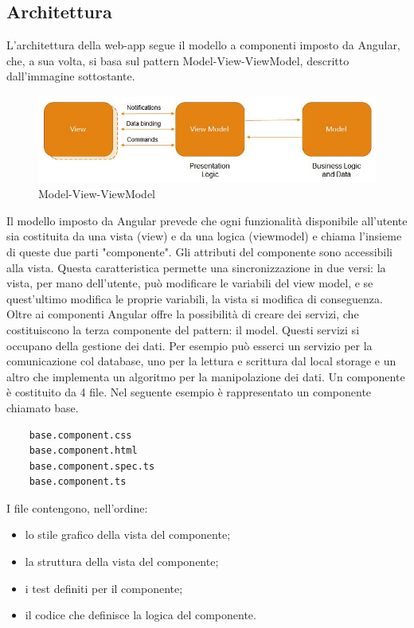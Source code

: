 \subsection{Architettura}
L'architettura della web-app segue il modello a componenti imposto da Angular, che, a sua volta, si basa sul pattern Model-View-ViewModel, descritto dall'immagine sottostante.
\begin{figure}[H]
	\centering
	\includegraphics[width=15cm]{res/images/mvvm.jpg}
	\caption{Model-View-ViewModel}
	\label{fig:Model-View-ViewModel}
\end{figure}
Il modello imposto da Angular prevede che ogni funzionalità disponibile all'utente sia costituita da una vista (view) e da una logica (viewmodel) e chiama l'insieme di queste due parti "componente".
Gli attributi del componente sono accessibili alla vista. Questa caratteristica permette una sincronizzazione in due versi: la vista, per mano dell'utente, può modificare le variabili del view model, e se quest'ultimo modifica le proprie variabili, la vista si modifica di conseguenza.
Oltre ai componenti Angular offre la possibilità di creare dei servizi, che costituiscono la terza componente del pattern: il model. Questi servizi si occupano della gestione dei dati. Per esempio può esserci un servizio per la comunicazione col database, uno per la lettura e scrittura dal local storage e un altro che implementa un algoritmo per la manipolazione dei dati.
Un componente è costituito da 4 file. Nel seguente esempio è rappresentato un componente chiamato base.
\begin{verbatim}
	base.component.css
	base.component.html
	base.component.spec.ts
	base.component.ts
\end{verbatim}
I file contengono, nell'ordine:
\begin{itemize}
	\item lo stile grafico della vista del componente;
	\item la struttura della vista del componente;
	\item i test definiti per il componente;
	\item il codice che definisce la logica del componente.
\end{itemize}

